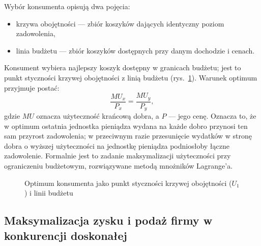 Wybór konsumenta opisują dwa pojęcia:
\begin{itemize}
  \item krzywa obojętności --- zbiór koszyków dających identyczny poziom zadowolenia,
  \item linia budżetu --- zbiór koszyków dostępnych przy danym dochodzie i cenach.
\end{itemize}

Konsument wybiera najlepszy koszyk dostępny w granicach budżetu; jest to punkt styczności krzywej obojętności z linią budżetu (rys.~\ref{fig:konsument}). Warunek optimum przyjmuje postać:
\begin{equation}
\frac{MU_x}{P_x}=\frac{MU_y}{P_y},
\end{equation}
gdzie $MU$ oznacza użyteczność krańcową dobra, a $P$ --- jego cenę. Oznacza to, że w optimum ostatnia jednostka pieniądza wydana na każde dobro przynosi ten sam przyrost zadowolenia; w przeciwnym razie przesunięcie wydatków w stronę dobra o wyższej użyteczności na jednostkę pieniądza podniosłoby łączne zadowolenie. Formalnie jest to zadanie maksymalizacji użyteczności przy ograniczeniu budżetowym, rozwiązywane metodą mnożników Lagrange'a.

\begin{figure}[h]
\centering
{}
\caption{Optimum konsumenta jako punkt styczności krzywej obojętności ($U_1$) i linii budżetu}
\label{fig:konsument}
\zrodlo
\end{figure}

\subsection{Maksymalizacja zysku i podaż firmy w konkurencji doskonałej}

